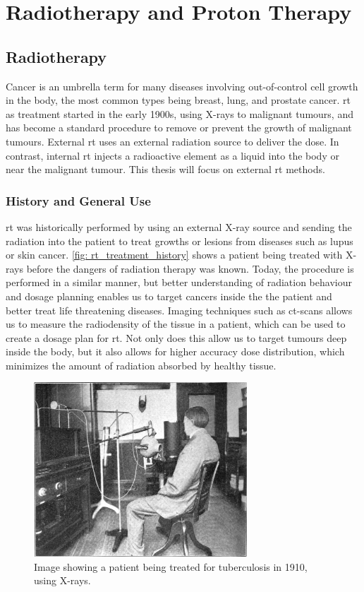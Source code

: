 \documentclass[main.tex]{subfiles}
\begin{document}
\section{Radiotherapy and Proton Therapy}

\subsection{Radiotherapy}

Cancer is an umbrella term for many diseases involving out-of-control cell growth in the body, the most common types being breast, lung, and prostate cancer\cite{cancerData}. \gls{rt} as treatment started in the early 1900s, using X-rays to malignant tumours, and has become a standard procedure to remove or prevent the growth of malignant tumours. External \gls{rt} uses an external radiation source to deliver the dose. In contrast, internal \gls{rt} injects a radioactive element as a liquid into the body or near the malignant tumour. This thesis will focus on external \gls{rt} methods.
 
 \subsubsection{History and General Use}
 
 \gls{rt} was historically performed by using an external X-ray source and sending the radiation into the patient to treat growths or lesions from diseases such as lupus or skin cancer. \autoref{fig: rt_treatment_history} shows a patient being treated with X-rays before the dangers of radiation therapy was known. Today, the procedure is performed in a similar manner, but better understanding of radiation behaviour and dosage planning enables us to target cancers inside the the patient and better treat life threatening diseases. Imaging techniques such as \gls{ct}-scans allows us to measure the radiodensity of the tissue in a patient, which can be used to create a dosage plan for \gls{rt}. Not only does this allow us to target tumours deep inside the body, but it also allows for higher accuracy dose distribution, which minimizes the amount of radiation absorbed by healthy tissue.
 
  \begin{figure}[!htpb]
    \centering
    \includegraphics[width=8cm ]{images/x_ray_treatment_history.jpg}
    \caption{Image showing a patient being treated for tuberculosis in 1910, using X-rays.\cite{rt_history}}
    \label{fig: rt_treatment_history}
\end{figure}
 
\end{document}
